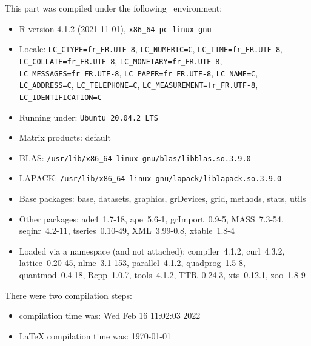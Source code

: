 \documentclass{article}
\begin{document}
\begin{scriptsize}

This part was compiled under the following \Rlogo{}~environment:

\begin{itemize}\raggedright
  \item R version 4.1.2 (2021-11-01), \verb|x86_64-pc-linux-gnu|
  \item Locale: \verb|LC_CTYPE=fr_FR.UTF-8|, \verb|LC_NUMERIC=C|, \verb|LC_TIME=fr_FR.UTF-8|, \verb|LC_COLLATE=fr_FR.UTF-8|, \verb|LC_MONETARY=fr_FR.UTF-8|, \verb|LC_MESSAGES=fr_FR.UTF-8|, \verb|LC_PAPER=fr_FR.UTF-8|, \verb|LC_NAME=C|, \verb|LC_ADDRESS=C|, \verb|LC_TELEPHONE=C|, \verb|LC_MEASUREMENT=fr_FR.UTF-8|, \verb|LC_IDENTIFICATION=C|
  \item Running under: \verb|Ubuntu 20.04.2 LTS|
  \item Matrix products: default
  \item BLAS:   \verb|/usr/lib/x86_64-linux-gnu/blas/libblas.so.3.9.0|
  \item LAPACK: \verb|/usr/lib/x86_64-linux-gnu/lapack/liblapack.so.3.9.0|
  \item Base packages: base, datasets, graphics, grDevices, grid,
    methods, stats, utils
  \item Other packages: ade4~1.7-18, ape~5.6-1, grImport~0.9-5,
    MASS~7.3-54, seqinr~4.2-11, tseries~0.10-49, XML~3.99-0.8,
    xtable~1.8-4
  \item Loaded via a namespace (and not attached): compiler~4.1.2,
    curl~4.3.2, lattice~0.20-45, nlme~3.1-153, parallel~4.1.2,
    quadprog~1.5-8, quantmod~0.4.18, Rcpp~1.0.7, tools~4.1.2,
    TTR~0.24.3, xts~0.12.1, zoo~1.8-9
\end{itemize}
There were two compilation steps:

\begin{itemize}
  \item \Rlogo{} compilation time was: Wed Feb 16 11:02:03 2022
  \item \LaTeX{} compilation time was: \today
\end{itemize}

\end{scriptsize}



\clearpage
{}


\end{document}
